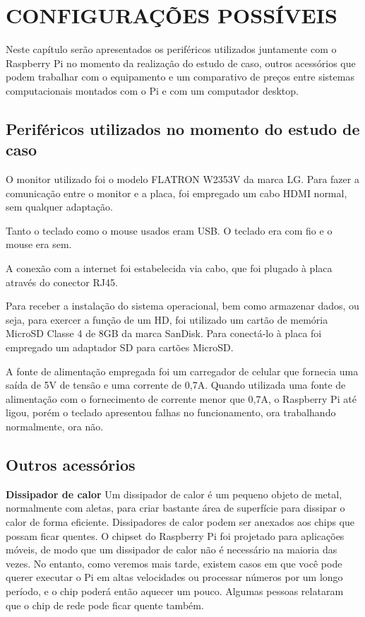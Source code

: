 \chapter{CONFIGURAÇÕES POSSÍVEIS}

Neste capítulo serão apresentados os periféricos utilizados juntamente com o Raspberry Pi no momento da realização do estudo de caso, outros acessórios que podem trabalhar com o equipamento e um comparativo de preços entre sistemas computacionais montados com o Pi e com um computador desktop.

\section{Periféricos utilizados no momento do estudo de caso}

O monitor utilizado foi o modelo FLATRON W2353V da marca LG. Para fazer a comunicação entre o monitor e a placa, foi empregado um cabo HDMI normal, sem qualquer adaptação.

Tanto o teclado como o mouse usados eram USB. O teclado era com fio e o mouse era sem.

A conexão com a internet foi estabelecida via cabo, que foi plugado à placa através do conector RJ45.

Para receber a instalação do sistema operacional, bem como armazenar dados, ou seja, para exercer a função de um HD, foi utilizado um cartão de memória MicroSD Classe 4 de 8GB da marca SanDisk. Para conectá-lo à placa foi empregado um adaptador SD para cartões MicroSD.

A fonte de alimentação empregada foi um carregador de celular que fornecia uma saída de 5V de tensão e uma corrente de 0,7A. Quando utilizada uma fonte de alimentação com o fornecimento de corrente menor que 0,7A, o Raspberry Pi até ligou, porém o teclado apresentou falhas no funcionamento, ora trabalhando normalmente, ora não.

\section{Outros acessórios}

\textbf{Dissipador de calor} Um dissipador de calor é um pequeno objeto de metal, normalmente com aletas, para criar bastante área de superfície para dissipar o calor de forma eficiente. Dissipadores de calor podem ser anexados aos chips que possam ficar quentes. O chipset do Raspberry Pi foi projetado para aplicações móveis, de modo que um dissipador de calor não é necessário na maioria das vezes. No entanto, como veremos mais tarde, existem casos em que você pode querer executar o Pi em altas velocidades ou processar números por um longo período, e o chip poderá então aquecer um pouco. Algumas pessoas relataram que o chip de rede pode ficar quente também.

